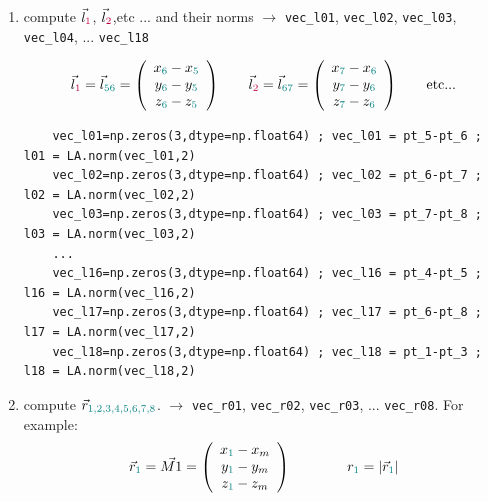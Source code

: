 \begin{enumerate}

\item compute $\vec{l}_{\color{purple}1}$, $\vec{l}_{\color{purple}2}$,etc ... and their norms
$\rightarrow$ \verb|vec_l01|, \verb|vec_l02|, \verb|vec_l03|, \verb|vec_l04|, ... \verb|vec_l18|

\[
\vec{l}_{\color{purple}1} = \vec{l}_{\color{teal}56} = \left(
\begin{array}{c}
x_{\color{teal}6}-x_{\color{teal}5} \\
y_{\color{teal}6}-y_{\color{teal}5} \\
z_{\color{teal}6}-z_{\color{teal}5}
\end{array}
\right)
\qquad
\vec{l}_{\color{purple}2} = \vec{l}_{\color{teal}67} = \left(
\begin{array}{c}
x_{\color{teal}7}-x_{\color{teal}6} \\
y_{\color{teal}7}-y_{\color{teal}6} \\
z_{\color{teal}7}-z_{\color{teal}6}
\end{array}
\right)
\qquad
\textrm{etc...}
\]

{\tiny
\begin{lstlisting}
    vec_l01=np.zeros(3,dtype=np.float64) ; vec_l01 = pt_5-pt_6 ; l01 = LA.norm(vec_l01,2)
    vec_l02=np.zeros(3,dtype=np.float64) ; vec_l02 = pt_6-pt_7 ; l02 = LA.norm(vec_l02,2)
    vec_l03=np.zeros(3,dtype=np.float64) ; vec_l03 = pt_7-pt_8 ; l03 = LA.norm(vec_l03,2)
    ...
    vec_l16=np.zeros(3,dtype=np.float64) ; vec_l16 = pt_4-pt_5 ; l16 = LA.norm(vec_l16,2)
    vec_l17=np.zeros(3,dtype=np.float64) ; vec_l17 = pt_6-pt_8 ; l17 = LA.norm(vec_l17,2)
    vec_l18=np.zeros(3,dtype=np.float64) ; vec_l18 = pt_1-pt_3 ; l18 = LA.norm(vec_l18,2)
\end{lstlisting}
}

\item compute $\vec{r}_{\color{teal} 1,2,3,4,5,6,7,8}$. $\rightarrow$ \verb|vec_r01|, \verb|vec_r02|, \verb|vec_r03|, ... \verb|vec_r08|.
For example:
\[
\vec{r}_{\color{teal}1} = \vec{M1} = \left(
\begin{array}{c}
x_{\color{teal}1}-x_m \\
y_{\color{teal}1}-y_m \\
z_{\color{teal}1}-z_m
\end{array}
\right)
\qquad\qquad
r_{\color{teal}1}= |\vec{r}_{\color{teal}1}|
\]


\end{enumerate}
